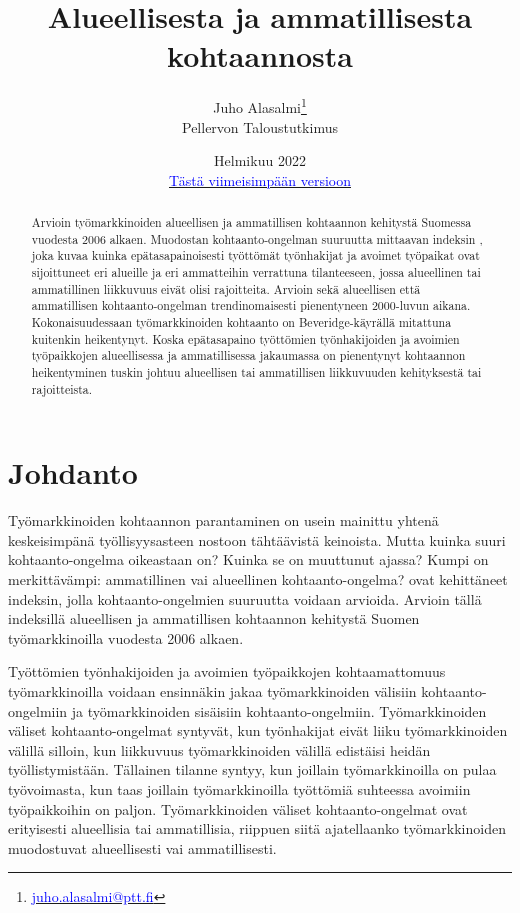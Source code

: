\documentclass[12pt]{article}
\title{Alueellisesta ja ammatillisesta kohtaannosta}
\date{Helmikuu 2022 \\ 
\href{https://github.com/pttry/kohtaantoindeksit/blob/main/text/kohtaantoindeksit.pdf}{\textcolor{blue}{Tästä viimeisimpään versioon}}}
\author{Juho Alasalmi\footnote{\href{mailto: juho.alasalmi@ptt.fi}{\textcolor{blue}{juho.alasalmi@ptt.fi}}} \\ 
Pellervon Taloustutkimus }
\begin{document}
\maketitle

\begin{abstract}
Arvioin työmarkkinoiden alueellisen ja ammatillisen kohtaannon kehitystä Suomessa vuodesta 2006 alkaen. Muodostan kohtaanto-ongelman suuruutta mittaavan indeksin \cite{csahin2014mismatch}, joka kuvaa kuinka epätasapainoisesti työttömät työnhakijat ja avoimet työpaikat ovat sijoittuneet eri alueille ja eri ammatteihin verrattuna tilanteeseen, jossa alueellinen tai ammatillinen liikkuvuus eivät olisi rajoitteita. Arvioin sekä alueellisen että ammatillisen kohtaanto-ongelman trendinomaisesti pienentyneen 2000-luvun aikana. Kokonaisuudessaan työmarkkinoiden kohtaanto on Beveridge-käyrällä mitattuna kuitenkin heikentynyt. Koska epätasapaino työttömien työnhakijoiden ja avoimien työpaikkojen alueellisessa ja ammatillisessa jakaumassa on pienentynyt kohtaannon heikentyminen tuskin johtuu alueellisen tai ammatillisen liikkuvuuden kehityksestä tai rajoitteista.
\end{abstract}



\section{Johdanto} \label{section:johdanto}

Työmarkkinoiden kohtaannon parantaminen on usein mainittu yhtenä keskeisimpänä työllisyysasteen nostoon tähtäävistä keinoista. Mutta kuinka suuri kohtaanto-ongelma oikeastaan on? Kuinka se on muuttunut ajassa? Kumpi on merkittävämpi: ammatillinen vai alueellinen kohtaanto-ongelma?  ovat kehittäneet indeksin, jolla kohtaanto-ongelmien suuruutta voidaan arvioida. Arvioin tällä indeksillä  alueellisen ja ammatillisen kohtaannon kehitystä Suomen työmarkkinoilla vuodesta 2006 alkaen.

Työttömien työnhakijoiden ja avoimien työpaikkojen kohtaamattomuus työmarkkinoilla voidaan ensinnäkin jakaa työmarkkinoiden välisiin kohtaanto-ongelmiin ja työmarkkinoiden sisäisiin kohtaanto-ongelmiin. Työmarkkinoiden väliset kohtaanto-ongelmat syntyvät, kun työnhakijat eivät liiku työmarkkinoiden välillä silloin, kun liikkuvuus työmarkkinoiden välillä edistäisi heidän työllistymistään. Tällainen tilanne syntyy, kun joillain työmarkkinoilla on pulaa työvoimasta, kun taas joillain työmarkkinoilla työttömiä suhteessa avoimiin työpaikkoihin on paljon. Työmarkkinoiden väliset kohtaanto-ongelmat ovat erityisesti alueellisia tai ammatillisia, riippuen siitä ajatellaanko työmarkkinoiden muodostuvat alueellisesti vai ammatillisesti.
\end{document}
